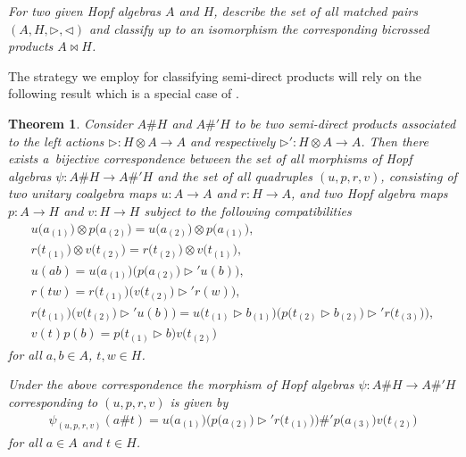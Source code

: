 \documentclass[11pt]{article}
\numberwithin{equation}{section}
\newtheorem{Theorem}{Theorem}[section]
\begin{document}
\textit{For two given Hopf algebras $A$ and $H$, describe the set of all matched pairs $(A, H, \triangleright, \triangleleft)$ and classify
up to an isomorphism the corresponding bicrossed products $A \bowtie H$.}

The strategy we employ for classifying semi-direct products will rely on the following result which is a special case of \cite[Corollary~3.3]{abm}.

\begin{Theorem}\label{toatemorf}
Consider $A \# H$ and $A \#' H$ to be two semi-direct products associated to the left actions $\triangleright \colon H\otimes A \to A$ and
respectively $\triangleright' \colon H\otimes A \to A$. Then there exists a~bijective correspondence between the set of all morphisms of Hopf
algebras $\psi \colon A \# H \to A \# ' H $ and the set of all quadruples $(u, p, r, v)$, consisting of two unitary coalgebra maps $u\colon A \to A$ and $r\colon H \rightarrow A$, and two Hopf algebra maps $p\colon A \to H$ and $v\colon H \rightarrow H$ subject to the following compatibilities
\begin{gather}
u\big(a_{(1)}\big) \otimes p\big(a_{(2)}\big) = u\big(a_{(2)}\big) \otimes p\big(a_{(1)}\big),\label{C1}\\
r\big(t_{(1)}\big) \otimes v\big(t_{(2)}\big) = r\big(t_{(2)}\big) \otimes v\big(t_{(1)}\big),\label{C2}\\
u(ab) = u\big(a_{(1)}\big) \big( p \big(a_{(2)}\big) \triangleright' u(b) \big),\label{C3}\\
r(tw) = r\big(t_{(1)}\big) \big(v\big(t_{(2)}\big) \triangleright' r(w)\big),\label{C4}\\
r\big(t_{(1)}\big) \big(v\big(t_{(2)}\big) \triangleright' u(b) \big) = u \big(t_{(1)} \triangleright b_{(1)}\big) \big( p \big(t_{(2)}
\triangleright b_{(2)}\big) \triangleright' r\big(t_{(3)}\big) \big) ,\label{C5}\\
v(t) p (b)= p \big(t_{(1)} \triangleright b\big) v \big(t_{(2)}\big)\label{C6}
\end{gather}
for all $a, b \in A$, $t, w \in H$.

Under the above correspondence the morphism of Hopf algebras $\psi\colon A \# H \to A \# ' H $ corresponding to $(u, p, r, v)$ is given by
\begin{gather*}%
\psi_{(u, p,r, v)}(a \# t) = u\big(a_{(1)}\big) \big( p\big(a_{(2)}\big) \triangleright' r\big(t_{(1)}\big) \big) \#' p\big(a_{(3)}\big) v\big(t_{(2)}\big)
\end{gather*}
for all $a \in A$ and $t\in H$.
\end{Theorem}
\end{document}
